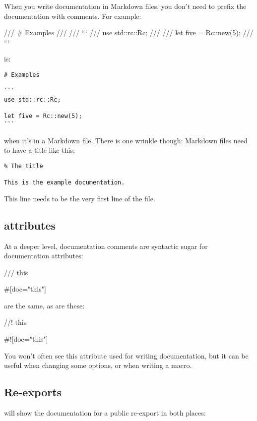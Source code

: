 \blank

When you write documentation in Markdown files, you don't need to prefix the documentation with comments. For example:

\begin{rustc}
/// # Examples
///
/// ```
/// use std::rc::Rc;
///
/// let five = Rc::new(5);
/// ```
\end{rustc}

is:

\begin{verbatim}
# Examples

```
use std::rc::Rc;

let five = Rc::new(5);
```
\end{verbatim}

when it's in a Markdown file. There is one wrinkle though: Markdown files need to have a title like this:

\begin{verbatim}
% The title

This is the example documentation.
\end{verbatim}

This \code{\%} line needs to be the very first line of the file.

\subsection*{ attributes}

At a deeper level, documentation comments are syntactic sugar for documentation attributes:

\begin{rustc}
/// this

#[doc="this"]
\end{rustc}

are the same, as are these:

\begin{rustc}
//! this

#![doc="this"]
\end{rustc}

You won't often see this attribute used for writing documentation, but it can be useful when changing some options, or when writing a macro.

\subsection*{Re-exports}

 will show the documentation for a public re-export in both places:

